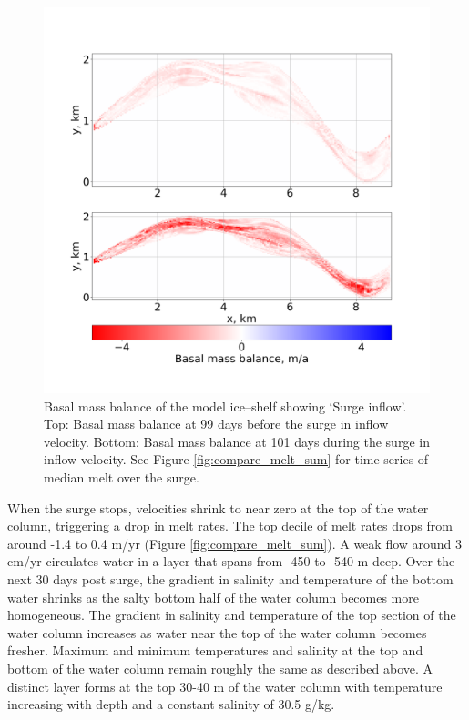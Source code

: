 \begin{figure}[!ht]
\centering
\includegraphics[width=1\textwidth]{chapters/4/surge_melt.png}
\caption[]{Basal mass balance of the model ice--shelf showing `Surge inflow'. Top: Basal mass balance at 99 days before the surge in inflow velocity. Bottom: Basal mass balance at 101 days during the surge in inflow velocity. See Figure \ref{fig:compare_melt_sum} for time series of median melt over the surge.}
\label{fig:surge_melt}
\end{figure}

When the surge stops, velocities shrink to near zero at the top of the water column, triggering a drop in melt rates. The top decile of melt rates drops from around -1.4 to 0.4 m/yr (Figure \ref{fig:compare_melt_sum}). A weak flow around 3 cm/yr circulates water in a layer that spans from -450 to -540 m deep. Over the next 30 days post surge, the gradient in salinity and temperature of the bottom water shrinks as the salty bottom half of the water column becomes more homogeneous. The gradient in salinity and temperature of the top section of the water column increases as water near the top of the water column becomes fresher. Maximum and minimum temperatures and salinity at the top and bottom of the water column remain roughly the same as described above. A distinct layer forms at the top 30-40 m of the water column with temperature increasing with depth and a constant salinity of 30.5 g/kg. 


